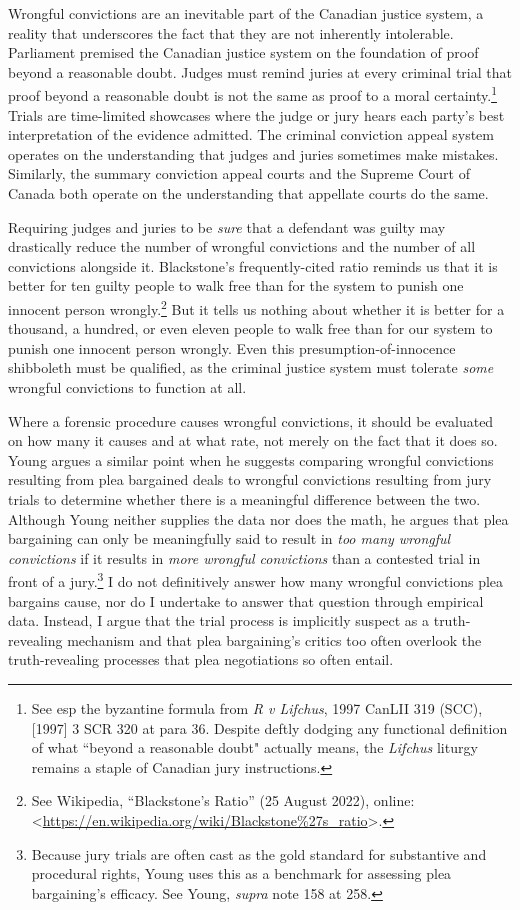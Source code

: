 Wrongful convictions are an inevitable part of the Canadian justice system, a reality that underscores the fact that they are not inherently intolerable. Parliament premised the Canadian justice system on the foundation of proof beyond a reasonable doubt. Judges must remind juries at every criminal trial that proof beyond a reasonable doubt is not the same as proof to a moral certainty.\footnote{See esp the byzantine formula from \textit{R v Lifchus}, 1997 CanLII 319 (SCC), [1997] 3 SCR 320 at para 36. Despite deftly dodging any functional definition of what ``beyond a reasonable doubt" actually means, the \textit{Lifchus} liturgy remains a staple of Canadian jury instructions.} Trials are time-limited showcases where the judge or jury hears each party's best interpretation of the evidence admitted. The criminal conviction appeal system operates on the understanding that judges and juries sometimes make mistakes. Similarly, the summary conviction appeal courts and the Supreme Court of Canada both operate on the understanding that appellate courts do the same. 

Requiring judges and juries to be \textit{sure} that a defendant was guilty may drastically reduce the number of wrongful convictions and the number of all convictions alongside it. Blackstone's frequently-cited ratio reminds us that it is better for ten guilty people to walk free than for the system to punish one innocent person wrongly.\footnote{See Wikipedia, “Blackstone's Ratio” (25 August 2022), online:\textless \url{https://en.wikipedia.org/wiki/Blackstone\%27s_ratio}\textgreater.} But it tells us nothing about whether it is better for a thousand, a hundred, or even eleven people to walk free than for our system to punish one innocent person wrongly. Even this presumption-of-innocence shibboleth must be qualified, as the criminal justice system must tolerate \textit{some} wrongful convictions to function at all. 

Where a forensic procedure causes wrongful convictions, it should be evaluated on how many it causes and at what rate, not merely on the fact that it does so. Young argues a similar point when he suggests comparing wrongful convictions resulting from plea bargained deals to wrongful convictions resulting from jury trials to determine whether there is a meaningful difference between the two. Although Young neither supplies the data nor does the math, he argues that plea bargaining can only be meaningfully said to result in \textit{too many wrongful convictions} if it results in \textit{more wrongful convictions} than a contested trial in front of a jury.\footnote{Because jury trials are often cast as the gold standard for substantive and procedural rights, Young uses this as a benchmark for assessing plea bargaining's efficacy. See Young, \textit{supra} note 158 at 258.} I do not definitively answer how many wrongful convictions plea bargains cause, nor do I undertake to answer that question through empirical data. Instead, I argue that the trial process is implicitly suspect as a truth-revealing mechanism and that plea bargaining's critics too often overlook the truth-revealing processes that plea negotiations so often entail. 

